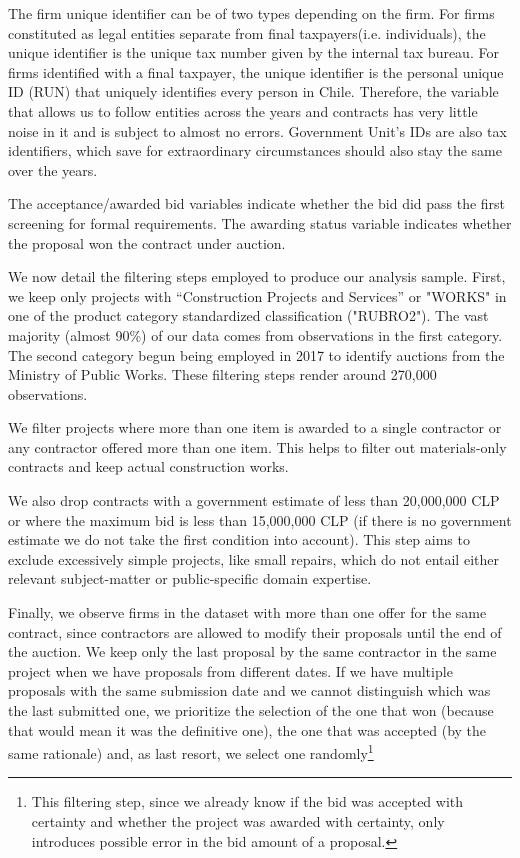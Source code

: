 
The firm unique identifier can be of two types depending on the firm. For firms constituted as legal entities separate from final taxpayers(i.e. individuals), the unique identifier is the unique tax number given by the internal tax bureau. For firms identified with a final taxpayer, the unique identifier is the personal unique ID (RUN) that uniquely identifies every person in Chile. Therefore, the variable that allows us to follow entities across the years and contracts has very little noise in it and is subject to almost no errors. Government Unit's IDs are also tax identifiers, which save for extraordinary circumstances should also stay the same over the years.

The acceptance/awarded bid variables indicate whether the bid did pass the first screening for formal requirements. The awarding status variable indicates whether the proposal won the contract under auction.

We now detail the filtering steps employed to produce our analysis sample. First, we keep only projects with “Construction Projects and Services” or "WORKS"  in one of the product category standardized classification ("RUBRO2"). The vast majority (almost 90\%) of our data comes from observations in the first category. The second category begun being employed in 2017 to identify auctions from the Ministry of Public Works. These filtering steps render around 270,000 observations.

We filter projects where more than one item is awarded to a single contractor or any contractor offered more than one item. This helps to filter out materials-only contracts and keep actual construction works.

We also drop contracts with a government estimate of less than 20,000,000 CLP or where the maximum bid is less than 15,000,000 CLP (if there is no government estimate we do not take the first condition into account). This step aims to exclude excessively simple projects, like small repairs, which do not entail either relevant subject-matter or public-specific domain expertise.

Finally, we observe firms in the dataset with more than one offer for the same contract, since contractors are allowed to modify their proposals until the end of the auction. We keep only the last proposal by the same contractor in the same project when we have proposals from different dates. If we have multiple proposals with the same submission date and we cannot distinguish which was the last submitted one, we prioritize the selection of the one that won (because that would mean it was the definitive one), the one that was accepted (by the same rationale) and, as last resort, we select one randomly\footnote{This filtering  step, since we already know if the bid was accepted with certainty and whether the project was awarded with certainty, only introduces possible error in the bid amount of a proposal. }%

